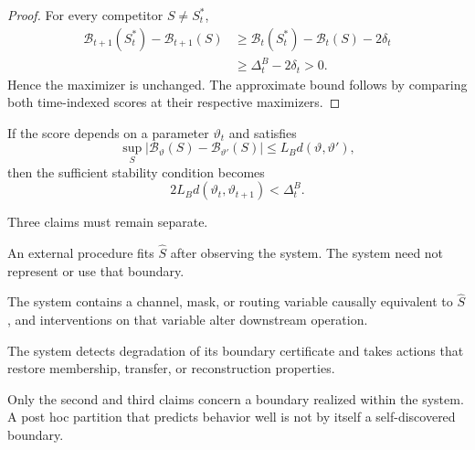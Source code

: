 \begin{proof}
For every competitor \(S\neq S_t^*\),
\[
\begin{aligned}
\mathcal B_{t+1}(S_t^*)-
\mathcal B_{t+1}(S)
&\geq
\mathcal B_t(S_t^*)-
\mathcal B_t(S)-2\delta_t\\
&\geq
\Delta_t^B-2\delta_t>0.
\end{aligned}
\]
Hence the maximizer is unchanged. The approximate bound follows by comparing
both time-indexed scores at their respective maximizers.
\end{proof}

If the score depends on a parameter \(\vartheta_t\) and satisfies
\[
\sup_S
|\mathcal B_{\vartheta}(S)-\mathcal B_{\vartheta'}(S)|
\leq
L_Bd(\vartheta,\vartheta'),
\]
then the sufficient stability condition becomes
\[
2L_Bd(\vartheta_t,\vartheta_{t+1})
<
\Delta_t^B.
\]


Three claims must remain separate.

\begin{description}[leftmargin=2.1em,style=nextline]
\item[Analyst-discovered boundary.]
An external procedure fits \(\widehat S\) after observing the system. The
system need not represent or use that boundary.

\item[System-instantiated boundary.]
The system contains a channel, mask, or routing variable causally equivalent to
\(\widehat S\), and interventions on that variable alter downstream operation.

\item[Self-maintained boundary.]
The system detects degradation of its boundary certificate and takes actions
that restore membership, transfer, or reconstruction properties.
\end{description}

Only the second and third claims concern a boundary realized within the
system. A post hoc partition that predicts behavior well is not by itself a
self-discovered boundary.


